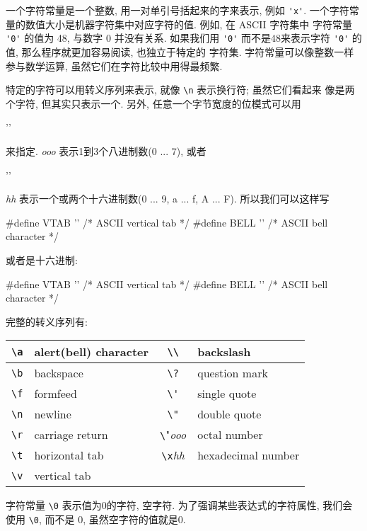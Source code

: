 一个字符常量是一个整数, 用一对单引号括起来的字来表示, 例如 \verb"'x'".
一个字符常量的数值大小是机器字符集中对应字符的值. 例如, 在 ASCII 字符集中
字符常量 \verb"'0'" 的值为 48, 与数字 0 并没有关系. 如果我们用 \verb"'0'"
而不是48来表示字符 \verb"'0'" 的值, 那么程序就更加容易阅读, 也独立于特定的
字符集. 字符常量可以像整数一样参与数学运算, 虽然它们在字符比较中用得最频繁.

特定的字符可以用转义序列来表示, 就像 \verb"\n" 表示换行符; 虽然它们看起来
像是两个字符, 但其实只表示一个. 另外, 任意一个字节宽度的位模式可以用
\begin{myverbatim}
    '\ooo'
\end{myverbatim}
来指定. \textit{ooo} 表示1到3个八进制数(0 ... 7), 或者 
\begin{myverbatim}
    '\xhh'
\end{myverbatim}
\textit{hh} 表示一个或两个十六进制数(0 ... 9, a ... f, A ... F).
所以我们可以这样写
\begin{myverbatim}
    #define VTAB    ''  /* ASCII vertical tab */
    #define BELL    ''  /* ASCII bell character */
\end{myverbatim}
或者是十六进制:
\begin{myverbatim}
    #define VTAB    '\xb'   /* ASCII vertical tab */
    #define BELL    ''   /* ASCII bell character */
\end{myverbatim}
完整的转义序列有:

\begin{tabular}{|c|l|c|l|}
    \hline
    \verb"\a"   & alert(bell) character & \verb"\\" & backslash \\
    \hline
    \verb"\b"   & backspace             & \verb"\?" & question mark \\
    \hline
    \verb"\f"   & formfeed              & \verb"\'"  & single quote  \\
    \hline 
    \verb"\n"   & newline               & \verb=\"=  & double quote  \\
    \hline
    \verb"\r"   & carriage return       & \verb"\"\textit{ooo} & octal
    number \\
    \hline
    \verb"\t"   & horizontal tab        & \verb"\x"\textit{hh}  &
    hexadecimal number \\
    \hline
    \verb"\v"   & vertical tab          &                       &   \\
    \hline
\end{tabular}

字符常量 \verb"\0" 表示值为0的字符, 空字符. 为了强调某些表达式的字符属性,
我们会使用 \verb"\0", 而不是 0, 虽然空字符的值就是0.

